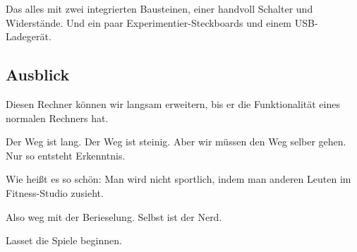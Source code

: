 \documentclass[a5paper,ngerman]{article}
\begin{document}
\begin{multicols}{2}
Das alles mit zwei integrierten Bausteinen,
einer handvoll Schalter und Widerstände.
Und ein paar Experimentier-Steckboards und einem USB-Ladegerät.

\subsection{Ausblick}

Diesen Rechner können wir langsam erweitern,
bis er die Funktionalität eines normalen Rechners hat.

Der Weg ist lang.
Der Weg ist steinig.
Aber wir müssen den Weg selber gehen.
Nur so entsteht Erkenntnis.

Wie heißt es so schön:
Man wird nicht sportlich, indem man anderen Leuten im Fitness-Studio
zusieht.

Also weg mit der Berieselung.
Selbst ist der Nerd.

Lasset die Spiele beginnen.

\end{multicols}
\end{document}
